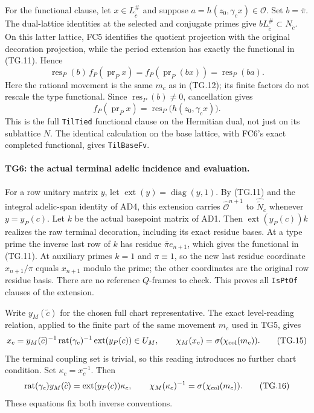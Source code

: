 \documentclass[11pt,a4paper]{article}
\numberwithin{equation}{section}
\theoremstyle{remark}\newtheorem{remark}[theorem]{Remark}
\begin{document}
For the functional clause, let $x\in L_{\widetilde c}^{\#}$ and
suppose $a=h(z_0,\gamma_cx)\in\mathcal O$. Set $b=\bar\pi$.
The dual-lattice identities at the selected and conjugate primes
give $bL_{\widetilde c}^{\#}\subset N_{\widetilde c}$.
On this latter lattice, FC5 identifies the quotient projection
with the original decoration projection, while the period
extension has exactly the functional in (TG.11). Hence
\[
 \operatorname{res}_P(b)\,
   f_P(\operatorname{pr}_P x)
   =f_P(\operatorname{pr}_P(bx))
   =\operatorname{res}_P(ba).
 \tag{TG.13}
\]
Here the rational movement is the same $m_c$ as in (TG.12);
its finite factors do not rescale the type functional.
Since $\operatorname{res}_P(b)\ne0$, cancellation gives
\[
 f_P(\operatorname{pr}_P x)
       =\operatorname{res}_P\bigl(h(z_0,\gamma_cx)\bigr).
 \tag{TG.14}
\]
This is the full \texttt{TilTied} functional clause on the
Hermitian dual, not just on its sublattice $N$. The identical
calculation on the base lattice, with FC6's exact completed
functional, gives \texttt{TilBaseFv}.

\paragraph{TG6: the actual terminal adelic incidence and evaluation.}
For a row unitary matrix $y$, let
$\operatorname{ext}(y)=\operatorname{diag}(y,1)$. By (TG.11)
and the integral adelic-span identity of AD4, this extension
carries $\widehat{\mathcal O}^{n+1}$ to
$\widehat{\widetilde N}_c$ whenever $y=y_P(c)$.
Let $k$ be the actual basepoint matrix of AD1. Then
$\operatorname{ext}(y_P(c))k$ realizes the raw terminal
decoration, including its exact residue bases. At a type prime
the inverse last row of $k$ has residue
$\bar\pi e_{n+1}$, which gives the functional in (TG.11).
At auxiliary primes $k=1$ and $\pi\equiv1$, so the new last
residue coordinate $x_{n+1}/\pi$ equals $x_{n+1}$ modulo the
prime; the other coordinates are the original row residue basis.
There are no reference $Q$-frames to check. This proves all
\texttt{IsPtOf} clauses of the extension.

Write $y_M(\widetilde c)$ for the chosen full chart representative.
The exact level-reading relation, applied to the finite part of
the same movement $m_c$ used in TG5, gives
\[
 x_c=y_M(\widetilde c)^{-1}
       \operatorname{rat}(\gamma_c)^{-1}
       \operatorname{ext}(y_P(c))\in U_M,
 \qquad \chi_M(x_c)=\sigma(\chi_{\rm col}(m_c)).
 \tag{TG.15}
\]
The terminal coupling set is trivial, so this reading introduces
no further chart condition. Set $\kappa_c=x_c^{-1}$. Then
\[
 \operatorname{rat}(\gamma_c)y_M(\widetilde c)
       =\operatorname{ext}(y_P(c))\kappa_c,
 \qquad
 \chi_M(\kappa_c)^{-1}=\sigma(\chi_{\rm col}(m_c)).
 \tag{TG.16}
\]
These equations fix both inverse conventions.
\end{document}
